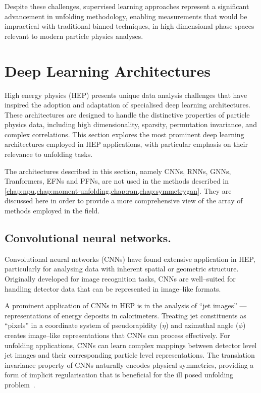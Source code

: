         Despite these challenges, supervised learning approaches represent a significant advancement in unfolding methodology, enabling measurements that would be impractical with traditional binned techniques, in high dimensional phase spaces relevant to modern particle physics analyses.

\section{Deep Learning Architectures}
\sectionminitoc

High energy physics (HEP) presents unique data analysis challenges that have inspired the adoption and adaptation of specialised deep learning architectures.
%
These architectures are designed to handle the distinctive properties of particle physics data, including high dimensionality, sparsity, permutation invariance, and complex correlations.
%
This section explores the most prominent deep learning architectures employed in HEP applications, with particular emphasis on their relevance to unfolding tasks.
\begin{note*}
    The architectures described in this section, namely CNNs, RNNs, GNNs, Tranformers, EFNs and PFNs, are not used in the methods described in \cref{chap:npu,chap:moment-unfolding,chap:ran,chap:symmetrygan}. They are discussed here in order to provide a more comprehensive view of the array of methods employed in the field.
\end{note*}

\subsection{Convolutional neural networks.}

    Convolutional neural networks (CNNs) have found extensive application in HEP, particularly for analysing data with inherent spatial or geometric structure.
    Originally developed for image recognition tasks, CNNs are well--suited for handling detector data that can be represented in image--like formats.
    
    A prominent application of CNNs in HEP is in the analysis of ``jet images'' --- representations of energy deposits in calorimeters.
    Treating jet constituents as ``pixels'' in a coordinate system of pseudorapidity (\(\eta\)) and azimuthal angle (\(\phi\)) creates image--like representations that CNNs can process effectively.
    For unfolding applications, CNNs can learn complex mappings between detector level jet images and their corresponding particle level representations.
    The translation invariance property of CNNs naturally encodes physical symmetries, providing a form of implicit regularisation that is beneficial for the ill posed unfolding problem~\cite{wu_dense_2021}.
    
